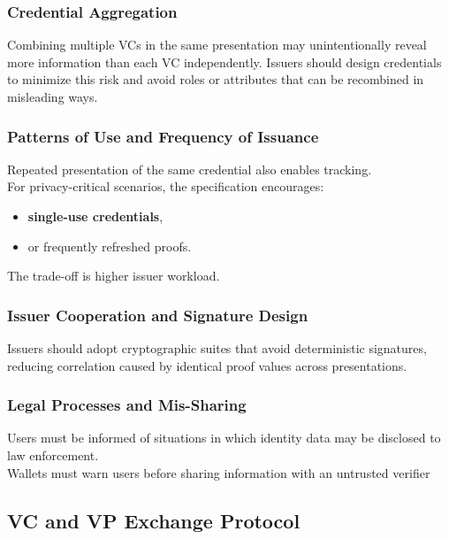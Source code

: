 \subsubsection *{Credential Aggregation}

Combining multiple VCs in the same presentation may unintentionally reveal more information than each VC independently. Issuers should design credentials to minimize this risk and avoid roles or attributes that can be recombined in misleading ways.

\subsubsection *{Patterns of Use and Frequency of Issuance}

Repeated presentation of the same credential also enables tracking.\\
For privacy-critical scenarios, the specification encourages:

\begin{itemize}
    \item \textbf{single-use credentials},
    \item or frequently refreshed proofs.
\end{itemize}

\noindent
The trade-off is higher issuer workload.

\subsubsection *{Issuer Cooperation and Signature Design}

Issuers should adopt cryptographic suites that avoid deterministic signatures, reducing correlation caused by identical proof values across presentations.

\subsubsection *{Legal Processes and Mis-Sharing}

Users must be informed of situations in which identity data may be disclosed to law enforcement.\\
Wallets must warn users before sharing information with an untrusted verifier


\subsection{ VC and VP Exchange Protocol}

